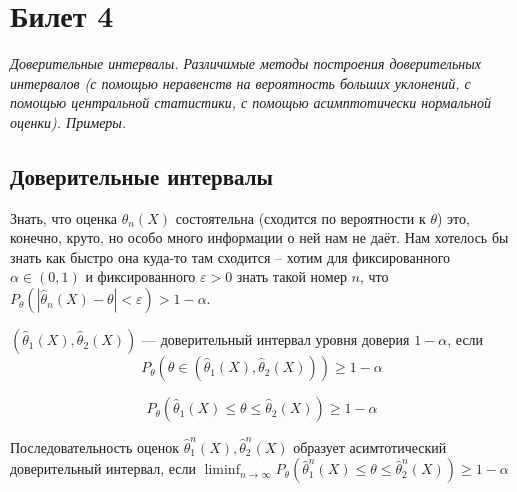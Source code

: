 \section{Билет 4}

\begin{center}
    \it
    Доверительные интервалы.
    Различимые методы построения доверительных интервалов (с помощью неравенств на вероятность больших уклонений, с помощью центральной статистики, с помощью асимптотически нормальной оценки).
    Примеры.
\end{center}

\subsection{Доверительные интервалы}

Знать, что оценка $\hat{\theta}_n(X)$ состоятельна (сходится по вероятности к $\theta$)
это, конечно, круто, но особо много информации о ней нам не даёт. Нам хотелось
бы знать как быстро она куда-то там сходится -- хотим для фиксированного
$\alpha \in (0, 1)$ и фиксированного $\varepsilon > 0$ знать такой номер $n$,
что $P_\theta(|\hat{\theta}_n(X) - \theta| < \varepsilon) > 1 - \alpha$.

\begin{definition*}
    $(\hat{\theta}_1(X), \hat{\theta}_2(X))$ --- доверительный интервал уровня 
    доверия $1 - \alpha$, если 
    \[
        P_\theta(\theta \in (\hat{\theta}_1(X), 
    \hat{\theta}_2(X))) \geq 1 - \alpha
    \]

    \[
    P_\theta(\hat{\theta}_1(X) \leq
    \theta \leq \hat{\theta}_2(X)) \geq 1 - \alpha
    \]
\end{definition*}

\begin{definition*}
    Последовательность оценок $\displaystyle \hat{\theta}_1^n(X), \hat{\theta}_2^n(X)$ образует
    асимтотический доверительный интервал, если $\displaystyle 
    \liminf_{n \to \infty}P_\theta(\hat{\theta}_1^n(X) \leq \theta \leq 
    \hat{\theta}_2^n(X)) \geq 1 - \alpha
    $
\end{definition*}


